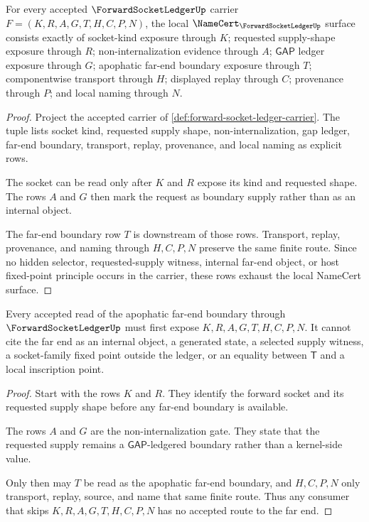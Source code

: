 \begin{theorem}
\label{thm:forward-socket-ledger-namecert-obligations}
For every accepted $\ForwardSocketLedgerUp$ carrier $F=(K,R,A,G,T,H,C,P,N)$, the local $\NameCert_{\ForwardSocketLedgerUp}$ surface consists exactly of socket-kind exposure through $K$; requested supply-shape exposure through $R$; non-internalization evidence through $A$; $\mathsf{GAP}$ ledger exposure through $G$; apophatic far-end boundary exposure through $T$; componentwise transport through $H$; displayed replay through $C$; provenance through $P$; and local naming through $N$.
\end{theorem}
\begin{proof}
Project the accepted carrier of \autoref{def:forward-socket-ledger-carrier}. The tuple lists socket kind, requested supply shape, non-internalization, gap ledger, far-end boundary, transport, replay, provenance, and local naming as explicit rows.

The socket can be read only after $K$ and $R$ expose its kind and requested shape. The rows $A$ and $G$ then mark the request as boundary supply rather than as an internal object.

The far-end boundary row $T$ is downstream of those rows. Transport, replay, provenance, and naming through $H,C,P,N$ preserve the same finite route. Since no hidden selector, requested-supply witness, internal far-end object, or host fixed-point principle occurs in the carrier, these rows exhaust the local NameCert surface.
\end{proof}

\begin{theorem}
\label{thm:forward-socket-ledger-apophatic-nonescape}
Every accepted read of the apophatic far-end boundary through $\ForwardSocketLedgerUp$ must first expose $K,R,A,G,T,H,C,P,N$. It cannot cite the far end as an internal object, a generated state, a selected supply witness, a socket-family fixed point outside the ledger, or an equality between $\mathsf{T}$ and a local inscription point.
\end{theorem}
\begin{proof}
Start with the rows $K$ and $R$. They identify the forward socket and its requested supply shape before any far-end boundary is available.

The rows $A$ and $G$ are the non-internalization gate. They state that the requested supply remains a $\mathsf{GAP}$-ledgered boundary rather than a kernel-side value.

Only then may $T$ be read as the apophatic far-end boundary, and $H,C,P,N$ only transport, replay, source, and name that same finite route. Thus any consumer that skips $K,R,A,G,T,H,C,P,N$ has no accepted route to the far end.
\end{proof}

